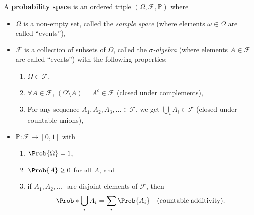 \begin{Definition}{}{}
    A \textbf{probability space} is an ordered triple
    $ (\Omega,\mathcal{F},\mathbb{P}) $ where
    \begin{itemize}
        \item $ \Omega $ is a non-empty set, called the \emph{sample space}
              (where elements
              $ \omega\in\Omega $ are called ``events''),
        \item $ \mathcal{F} $ is a collection of subsets of $ \Omega $,
              called the \emph{$ \sigma $-algebra} (where elements
              $ A\in\mathcal{F} $ are called ``events'') with the following properties:
              \begin{enumerate}[S1]
                  \item $ \Omega\in\mathcal{F} $,
                  \item $ \forall A\in \mathcal{F} $, $ (\Omega\setminus A)=A^c\in\mathcal{F} $ (closed under complements),
                  \item For any sequence $ A_1,A_2,A_3,\ldots\in\mathcal{F} $, we get
                        $ \bigcup_i A_i\in \mathcal{F} $ (closed under countable unions),
              \end{enumerate}
        \item $ \mathbb{P}\colon \mathcal{F}\to[0,1] $ with
              \begin{enumerate}[P1]
                  \item $ \Prob{\Omega}=1 $,
                  \item $ \Prob{A}\ge 0 $ for all $ A $, and
                  \item if $ A_1,A_2,\ldots, $ are disjoint elements of $ \mathcal{F} $,
                        then
                        \[ \Prob*{\bigcup_i A_i}=\sum_i \Prob{A_i}\quad\text{(countable additivity)}. \]
              \end{enumerate}
    \end{itemize}
\end{Definition}
